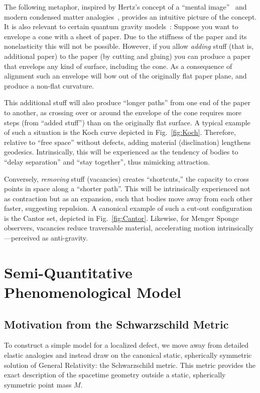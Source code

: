 \documentclass[%
  reprint,
  superscriptaddress,
  showpacs,
  showkeys,
  amsmath,amssymb,
  pra,
  longbibliography,
  floatfix,
  x11names
]{revtex4-2}
\begin{document}
The following metaphor, inspired by Hertz's concept of a ``mental image''~\cite{hertz-94e} and modern condensed matter analogies~\cite{zaanen-2022},
provides an intuitive picture of the concept. It is also relevant to certain quantum gravity models~\cite{Ambjorn2012_review, barkley-2019}:
Suppose you want to envelope a cone with a sheet of paper.
Due to the stiffness of the paper and its nonelasticity this will not be possible.
However, if you allow \emph{adding} stuff (that is, additional paper) to the paper (by cutting and gluing) you can
produce a paper that envelops any kind of surface, including the cone. As a consequence of alignment such an envelope will bow out of the originally flat
paper plane, and produce a non-flat curvature.

This additional stuff will also produce ``longer paths'' from one end of the paper to another,
as crossing over or around the envelope of the cone requires more steps (from ``added stuff'') than on the originally flat surface.
A typical example of such a situation is the Koch curve depicted in Fig.~\ref{fig:Koch}.
Therefore, relative to ``free space'' without defects, adding material (disclination) lengthens geodesics.
Intrinsically, this will be experienced as the tendency of bodies to ``delay separation'' and ``stay together'', thus mimicking attraction.

Conversely, \emph{removing} stuff (vacancies) creates ``shortcuts,'' the capacity to cross points in space
along a ``shorter path''. This will be intrinsically experienced not as contraction but as an expansion,
such that bodies move away from each other faster, suggesting repulsion.
A canonical example of such a cut-out configuration is the Cantor set, depicted in Fig.~\ref{fig:Cantor}.
Likewise, for Menger Sponge observers, vacancies reduce traversable material, accelerating motion intrinsically---perceived as anti-gravity.

\section{Semi-Quantitative Phenomenological Model}
\label{sec:quant}

\subsection{Motivation from the Schwarzschild Metric}

To construct a simple model for a localized defect, we move away from detailed elastic analogies and instead draw on the canonical static, spherically symmetric solution of General Relativity: the Schwarzschild metric. This metric provides the exact description of the spacetime geometry outside a static, spherically symmetric point mass \(M\).
\end{document}
